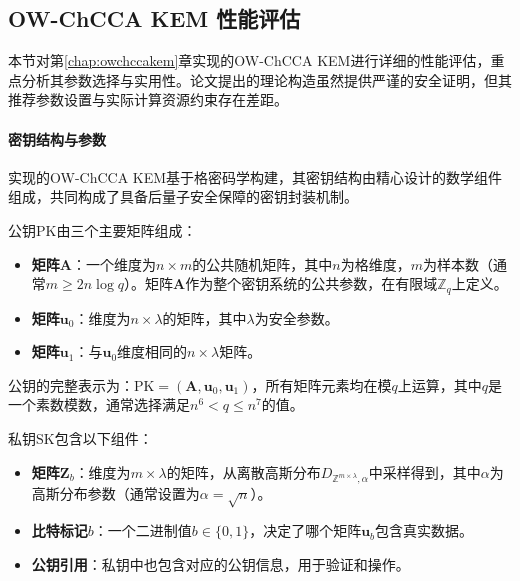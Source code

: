 \subsection{OW-ChCCA KEM 性能评估}

本节对第\ref{chap:owchccakem}章实现的OW-ChCCA KEM进行详细的性能评估，重点分析其参数选择与实用性。论文\cite{pan_lattice-based_2023}提出的理论构造虽然提供严谨的安全证明，但其推荐参数设置与实际计算资源约束存在差距。

\paragraph{密钥结构与参数}
\label{chap:key-structure-params}
实现的OW-ChCCA KEM基于格密码学构建，其密钥结构由精心设计的数学组件组成，共同构成了具备后量子安全保障的密钥封装机制。

公钥$\mathrm{PK}$由三个主要矩阵组成：

\begin{itemize}
    \item \textbf{矩阵$\mathbf{A}$}：一个维度为$n \times m$的公共随机矩阵，其中$n$为格维度，$m$为样本数（通常$m \geq 2n\log q$）。矩阵$\mathbf{A}$作为整个密钥系统的公共参数，在有限域$\mathbb{Z}_q$上定义。
    
    \item \textbf{矩阵$\mathbf{u}_0$}：维度为$n \times \lambda$的矩阵，其中$\lambda$为安全参数。
    
    \item \textbf{矩阵$\mathbf{u}_1$}：与$\mathbf{u}_0$维度相同的$n \times \lambda$矩阵。
\end{itemize}

公钥的完整表示为：$\mathrm{PK} = (\mathbf{A}, \mathbf{u}_0, \mathbf{u}_1)$，所有矩阵元素均在模$q$上运算，其中$q$是一个素数模数，通常选择满足$n^6 < q \leq n^7$的值。

私钥$\mathrm{SK}$包含以下组件：

\begin{itemize}
    \item \textbf{矩阵$\mathbf{Z}_b$}：维度为$m \times \lambda$的矩阵，从离散高斯分布$D_{\mathbb{Z}^{m \times \lambda}, \alpha}$中采样得到，其中$\alpha$为高斯分布参数（通常设置为$\alpha = \sqrt{n}$）。
    
    \item \textbf{比特标记$b$}：一个二进制值$b \in \{0,1\}$，决定了哪个矩阵$\mathbf{u}_b$包含真实数据。
    
    \item \textbf{公钥引用}：私钥中也包含对应的公钥信息，用于验证和操作。
\end{itemize}

